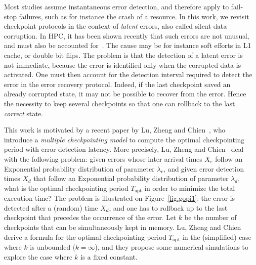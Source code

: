 \documentclass[10pt,table]{article}
\newcommand{\ema}[1]{\ensuremath{#1}\xspace}
\newcommand{\lambdae}{\ema{\lambda_{e}}}
\newcommand{\lambdad}{\ema{\lambda_{d}}}
\newcommand{\Topt}{\ema{T_{\text{opt}}}}
\begin{document}
Most studies assume instantaneous error detection, 
and therefore apply to fail-stop failures, such as for instance the crash of a resource. 
In this work, we revisit checkpoint protocols in the context of {\em latent} errors,
also called silent data corruption. In HPC, it has been shown recently that such errors
are not unusual, and must also be accounted for~\cite{Moody:2010:DME:1884643.1884666}. 
The cause may be for instance soft efforts in L1 cache, or double bit flips. The problem is that
the detection of a latent error is not immediate, because the error is identified only when 
the corrupted data is activated. One must then account for the detection interval required
to detect the error in the error recovery protocol. Indeed, if the last checkpoint saved
an already corrupted state, it may not be possible to recover from the error. Hence the
necessity to keep several checkpoints so that one can rollback to the last {\em correct}
state. 



This work is motivated by a recent paper by 
Lu, Zheng and Chien~\cite{LuZhengChien2013}, who introduce a \emph{multiple checkpointing model} 
to compute the optimal checkpointing period with error detection latency. 
More precisely, Lu, Zheng and Chien~\cite{LuZhengChien2013} deal with the following problem: 
given errors whose inter arrival times $X_{e}$ follow an Exponential probability distribution 
of parameter \lambdae, and given error detection times $X_{d}$ that follow an Exponential probability 
distribution of parameter \lambdad, what is the optimal
checkpointing period $\Topt$ in order to minimize the total execution time? 
The problem is illustrated on Figure~\ref{fig.gopi1}: the error is detected after a (random) time $X_{d}$, 
and one has to rollback up to the last checkpoint that precedes the occurrence of the error.  
Let $k$ be the number of
checkpoints that can be simultaneously kept in memory.
Lu, Zheng and Chien~\cite{LuZhengChien2013} derive a formula for 
the optimal
checkpointing period $\Topt$ in the (simplified) case where $k$ is unbounded  ($k = \infty$), and they propose some numerical simulations to explore the case where $k$ is a fixed constant.
\end{document}
